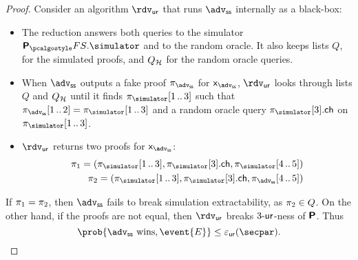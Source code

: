\let\accentvec\vec \documentclass[runningheads,10pt]{llncs}
\begin{document}
\begin{proof}
	Consider an algorithm $\rdvur$ that runs $\advss$ internally as a black-box:
	\begin{itemize}
		\item The reduction answers both queries to the simulator $\plonkprotfs.\simulator$ and to the random oracle. 
		It also keeps lists $Q$, for the simulated proofs, and $Q_{\mathcal{H}}$ for the random oracle queries. 
		\item When $\advss$ outputs a fake proof $\zkproof_{\advss}$ for  $\inp_\advss$, $\rdvur$ looks through lists $Q$ and $Q_{\mathcal{H}}$ until it finds 
		$\zkproof_{\simulator}\range{1}{3}$ such that $\zkproof_{\advss}\range{1}{2} = \zkproof_{\simulator}\range{1}{3}$ and a random oracle query $\zkproof_{\simulator}[3].\ch$ on $\zkproof_{\simulator}\range{1}{3}$.
		\item $\rdvur$ returns two proofs for $\inp_\advss$:
		\begin{align*}
			\zkproof_1 = (\zkproof_{\simulator}\range{1}{3}, \zkproof_{\simulator}[3].\ch, \zkproof_{\simulator}\range{4}{5})\\
			\zkproof_2 = (\zkproof_{\simulator}\range{1}{3}, \zkproof_{\simulator}[3].\ch, \zkproof_{\advss}\range{4}{5})
		\end{align*}
		\end{itemize}  
		If $\pi_1 = \pi_2$, then $\advss$ fails to break simulation extractability, as $\pi_2 \in Q$.
		On the other hand, if the proofs are not equal, then $\rdvur$ breaks ${3\text{-}\mathsf{ur}}$-ness of $\bm{\mathsf{P}}$. Thus 
		\[
			\prob{\advss \text{ wins}, \event{E}} \leq \epsur(\secpar).
		\]


\end{proof}
\end{document}

